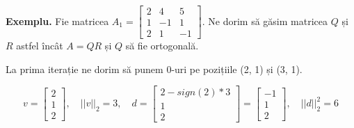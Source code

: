 \documentclass{exam}
\begin{document}
\par \textbf{Exemplu.} Fie matricea $A_1 = \begin{bmatrix} 2 & 4 & 5 \\ 1 & -1 & 1 \\ 2 & 1 & -1 \end{bmatrix}$.
Ne dorim să găsim matricea $Q$ și $R$ astfel încât $A = QR$ și $Q$ să fie ortogonală.

\par La prima iterație ne dorim să punem 0-uri pe pozițiile (2, 1) și (3, 1).

\begin{equation*}
	v = \begin{bmatrix} 2 \\ 1 \\ 2 \end{bmatrix}, \quad ||v||_2 = 3, \quad d = \begin{bmatrix} 2 -sign(2) * 3 \\ 1 \\ 2 \end{bmatrix} = \begin{bmatrix} -1 \\ 1 \\ 2 \end{bmatrix}, \quad ||d||_2^2 = 6
\end{equation*}
\end{document}
